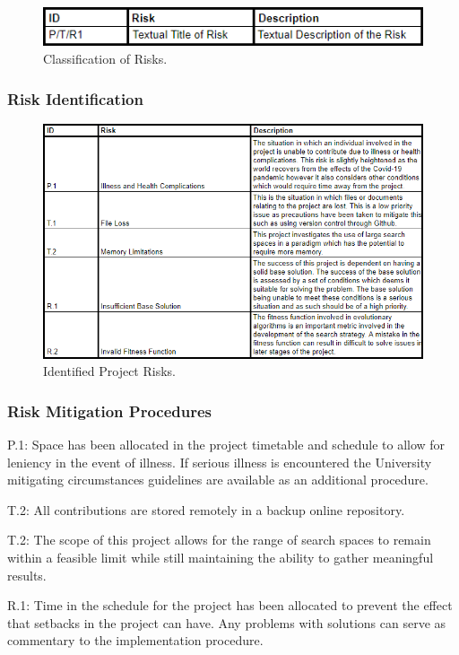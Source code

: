 \documentclass[11pt]{article}  %
\theoremstyle{definition}
\theoremstyle{remark}
\begin{document}
\begin{figure}[H]
\centering
\caption[Short Heading]{Classification of Risks.}
\includegraphics[scale=1]{RiskIdentify}
\end{figure}

\subsubsection {Risk Identification}

\begin{figure}[H]
\centering
\caption[Short Heading]{Identified Project Risks.}
\includegraphics[scale=0.75]{Risks}
\end{figure}

\subsubsection {Risk Mitigation Procedures}

P.1:	Space has been allocated in the project timetable and schedule to allow for leniency in the  event of illness. If serious illness is encountered the University mitigating circumstances guidelines are available as an additional procedure.

T.2:	All contributions are stored remotely in a backup online repository.

T.2:	The scope of this project allows for the range of search spaces to remain within a feasible limit while still maintaining the ability to gather meaningful results.

R.1: 	Time in the schedule for the project has been allocated to prevent the effect that setbacks in the project can have. Any problems with solutions can serve as commentary to the implementation procedure.
\end{document}
